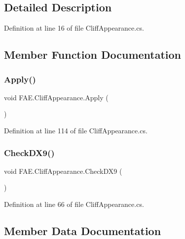 \subsection{Detailed Description}


Definition at line 16 of file Cliff\+Appearance.\+cs.



\subsection{Member Function Documentation}
\mbox{\label{class_f_a_e_1_1_cliff_appearance_ae0dce6392576b664c0e16082de746fb2}} 
\subsubsection{Apply()}
{\footnotesize\ttfamily void F\+A\+E.\+Cliff\+Appearance.\+Apply (\begin{DoxyParamCaption}{ }\end{DoxyParamCaption})}



Definition at line 114 of file Cliff\+Appearance.\+cs.

\mbox{\label{class_f_a_e_1_1_cliff_appearance_a7a6a513a85f4851022c21dcf2c2e5727}} 
\subsubsection{Check\+D\+X9()}
{\footnotesize\ttfamily void F\+A\+E.\+Cliff\+Appearance.\+Check\+D\+X9 (\begin{DoxyParamCaption}{ }\end{DoxyParamCaption})}



Definition at line 66 of file Cliff\+Appearance.\+cs.



\subsection{Member Data Documentation}
\mbox{\label{class_f_a_e_1_1_cliff_appearance_afc2681ae2a36b629ef3a6d600d107e28}} 
